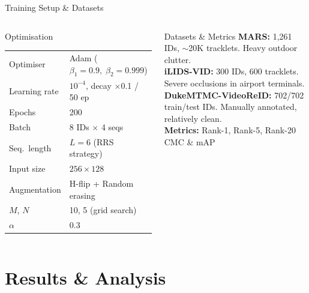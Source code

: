 \documentclass[aspectratio=169]{beamer}
\newcommand{\bt}[1]{\textbf{#1}}
\begin{document}
\begin{frame}{Training Setup \& Datasets}
  \begin{columns}[T]
      \begin{block}{Optimisation}
        \small
        \renewcommand{\arraystretch}{1.3}
        \begin{tabular}{@{}ll@{}}
          Optimiser     & Adam ($\beta_1{=}0.9,\;\beta_2{=}0.999$) \\
          Learning rate & $10^{-4}$, decay $\times$0.1 / 50 ep \\
          Epochs        & 200 \\
          Batch         & 8 IDs $\times$ 4 seqs \\
          Seq.\ length  & $L = 6$ (RRS strategy) \\
          Input size    & $256 \times 128$ \\
          Augmentation  & H-flip + Random erasing \\
          $M$, $N$      & 10, 5 (grid search) \\
          $\alpha$      & 0.3 \\
        \end{tabular}
      \end{block}

      \begin{block}{Datasets \& Metrics}
        \small
        \bt{MARS:} 1,261 IDs, $\sim$20K tracklets. Heavy outdoor clutter.\\[5pt]
        \bt{iLIDS-VID:} 300 IDs, 600 tracklets. Severe occlusions in airport terminals.\\[5pt]
        \bt{DukeMTMC-VideoReID:} 702/702 train/test IDs. Manually annotated, relatively clean.\\[8pt]
        \bt{Metrics:} Rank-1, Rank-5, Rank-20 CMC \& mAP
      \end{block}
  \end{columns}
\end{frame}

\section{Results \& Analysis}
\end{document}
